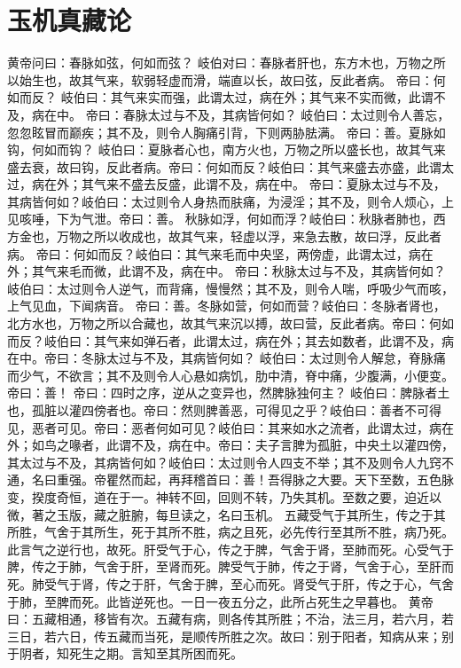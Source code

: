 \documentclass[a4paper,12pt,UTF8,twoside]{ctexbook}
\begin{document}
\chapter{玉机真藏论}
黄帝问曰：春脉如弦，何如而弦？
岐伯对曰：春脉者肝也，东方木也，万物之所以始生也，故其气来，软弱轻虚而滑，端直以长，故曰弦，反此者病。
帝曰：何如而反？
岐伯曰：其气来实而强，此谓太过，病在外；其气来不实而微，此谓不及，病在中。
帝曰：春脉太过与不及，其病皆何如？
岐伯曰：太过则令人善忘，忽忽眩冒而巅疾；其不及，则令人胸痛引背，下则两胁胠满。
帝曰：善。夏脉如钩，何如而钩？
岐伯曰：夏脉者心也，南方火也，万物之所以盛长也，故其气来盛去衰，故曰钩，反此者病。帝曰：何如而反？岐伯曰：其气来盛去亦盛，此谓太过，病在外；其气来不盛去反盛，此谓不及，病在中。
帝曰：夏脉太过与不及，其病皆何如？岐伯曰：太过则令人身热而肤痛，为浸淫；其不及，则令人烦心，上见咳唾，下为气泄。帝曰：善。
秋脉如浮，何如而浮？岐伯曰：秋脉者肺也，西方金也，万物之所以收成也，故其气来，轻虚以浮，来急去散，故曰浮，反此者病。
帝曰：何如而反？岐伯曰：其气来毛而中央坚，两傍虚，此谓太过，病在外；其气来毛而微，此谓不及，病在中。
帝曰：秋脉太过与不及，其病皆何如？
岐伯曰：太过则令人逆气，而背痛，慢慢然；其不及，则令人喘，呼吸少气而咳，上气见血，下闻病音。
帝曰：善。冬脉如营，何如而营？岐伯曰：冬脉者肾也，北方水也，万物之所以合藏也，故其气来沉以搏，故曰营，反此者病。帝曰：何如而反？岐伯曰：其气来如弹石者，此谓太过，病在外；其去如数者，此谓不及，病在中。帝曰：冬脉太过与不及，其病皆何如？
岐伯曰：太过则令人解怠，脊脉痛而少气，不欲言；其不及则令人心悬如病饥，肋中清，脊中痛，少腹满，小便变。帝曰：善！
帝曰：四时之序，逆从之变异也，然脾脉独何主？
岐伯曰：脾脉者土也，孤脏以灌四傍者也。帝曰：然则脾善恶，可得见之乎？岐伯曰：善者不可得见，恶者可见。帝曰：恶者何如可见？岐伯曰：其来如水之流者，此谓太过，病在外；如鸟之喙者，此谓不及，病在中。帝曰：夫子言脾为孤脏，中央土以灌四傍，其太过与不及，其病皆何如？岐伯曰：太过则令人四支不举；其不及则令人九窍不通，名曰重强。帝瞿然而起，再拜稽首曰：善！吾得脉之大要。天下至数，五色脉变，揆度奇恒，道在于一。神转不回，回则不转，乃失其机。至数之要，迫近以微，著之玉版，藏之脏腑，每旦读之，名曰玉机。
五藏受气于其所生，传之于其所胜，气舍于其所生，死于其所不胜，病之且死，必先传行至其所不胜，病乃死。此言气之逆行也，故死。肝受气于心，传之于脾，气舍于肾，至肺而死。心受气于脾，传之于肺，气舍于肝，至肾而死。脾受气于肺，传之于肾，气舍于心，至肝而死。肺受气于肾，传之于肝，气舍于脾，至心而死。肾受气于肝，传之于心，气舍于肺，至脾而死。此皆逆死也。一日一夜五分之，此所占死生之早暮也。
黄帝曰：五藏相通，移皆有次。五藏有病，则各传其所胜；不治，法三月，若六月，若三日，若六日，传五藏而当死，是顺传所胜之次。故曰：别于阳者，知病从来；别于阴者，知死生之期。言知至其所困而死。
\end{document}
